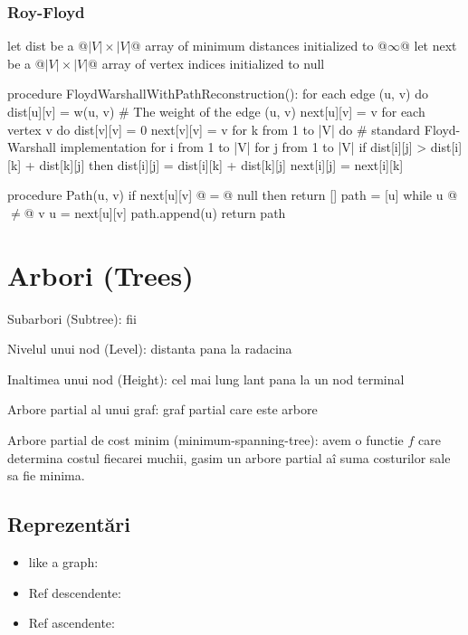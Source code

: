 \documentclass[11pt,a4paper]{report}
\begin{document}
\subsubsection*{Roy-Floyd}
\begin{py}
let dist be a @$|V| \times |V|$@ array of minimum distances initialized to @$\infty$@
let next be a @$|V| \times |V|$@ array of vertex indices initialized to null

procedure FloydWarshallWithPathReconstruction():
    for each edge (u, v) do
        dist[u][v] = w(u, v) # The weight of the edge (u, v)
        next[u][v] = v
    for each vertex v do
        dist[v][v] = 0
        next[v][v] = v
    for k from 1 to |V| do # standard Floyd-Warshall implementation
        for i from 1 to |V|
            for j from 1 to |V|
                if dist[i][j] > dist[i][k] + dist[k][j] then
                    dist[i][j] = dist[i][k] + dist[k][j]
                    next[i][j] = next[i][k]

procedure Path(u, v)
    if next[u][v] @$=$@ null then
        return []
    path = [u]
    while u @$\neq$@  v
        u = next[u][v]
        path.append(u)
    return path
  \end{py}
\section*{Arbori (Trees)}
\begin{description}\setlength{\itemsep}{-2pt}
  \item Subarbori (Subtree): fii
  \item Nivelul unui nod (Level): distanta pana la radacina
  \item Inaltimea unui nod (Height): cel mai lung lant pana la un nod terminal
  \item Arbore partial al unui graf: graf partial care este arbore
  \item Arbore partial de cost minim (minimum-spanning-tree): avem o functie $f$ care determina costul fiecarei muchii, gasim un arbore partial aî suma costurilor sale sa fie minima.
  \end{description}
  
\subsection*{Reprezentări}
\begin{itemize} \setlength{\itemsep}{-2pt}
  \item like a graph:  %
  \item Ref descendente: 
  \item Ref ascendente: 
\end{itemize}
\end{document}
